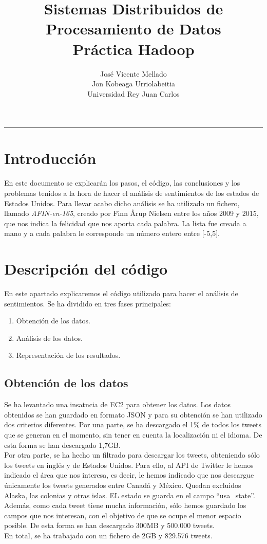 \documentclass[12pt,a4paper]{article}
\title{Sistemas Distribuidos de Procesamiento de Datos\\Práctica Hadoop}
\author{José Vicente Mellado \\ Jon Kobeaga Urriolabeitia\\Universidad Rey Juan Carlos}
\begin{document}
\maketitle
\hrule
\tableofcontents
\newpage
\section{Introducción}
En este documento se explicarán los pasos, el código, las conclusiones y los problemas tenidos a la hora de hacer el análisis de sentimientos de los estados de Estados Unidos. Para llevar acabo dicho análisis se ha utilizado un fichero, llamado \textit{AFIN-en-165}, creado por Finn Årup Nielsen entre los años 2009 y 2015, que nos indica la felicidad que nos aporta cada palabra. La lista fue creada a mano y a cada palabra le corresponde un número entero entre [-5,5].


\section{Descripción del código}

En este apartado explicaremos el código utilizado para hacer el análisis de sentimientos. Se ha dividido en tres fases principales:

\begin{enumerate}
\item Obtención de los datos.
\item Análisis de los datos.
\item Representación de los resultados.
\end{enumerate}

\subsection{Obtención de los datos}
Se ha levantado una insatncia de EC2 para obtener los datos. Los datos obtenidos se han guardado en formato JSON y para su obtención se han utilizado dos criterios diferentes. Por una parte, se ha descargado el 1\% de todos los tweets que se generan en el momento, sin tener en cuenta la localización ni el idioma. De esta forma se han descargado 1,7GB.\\
Por otra parte, se ha hecho un filtrado para descargar los tweets, obteniendo sólo los tweets en inglés y de Estados Unidos. Para ello, al API de Twitter le hemos indicado el área que nos interesa, es decir, le hemos indicado que nos descargue únicamente los tweets generados entre Canadá y México. Quedan excluidos Alaska, las colonias y otras islas. EL estado se guarda en el campo ``usa\_state''. Además, como cada tweet tiene mucha información, sólo hemos guardado los campos que nos interesan, con el objetivo de que se ocupe el menor espacio posible. De esta forma se han descargado 300MB y 500.000 tweets.\\
En total, se ha trabajado con un fichero de 2GB y 829.576 tweets.
\end{document}
